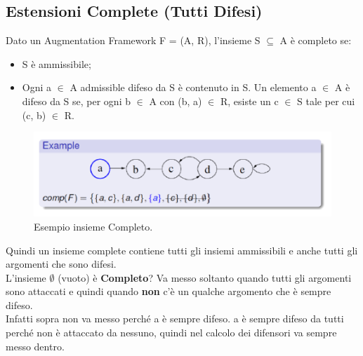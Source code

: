 \subsection{Estensioni Complete (Tutti Difesi)}
Dato un Augmentation Framework F = (A, R), l'insieme S $\subseteq$ A è completo
se:
\begin{itemize}
    \item S è ammissibile;
    \item Ogni a $\in$ A admissible difeso da S è contenuto in S. Un elemento a $\in$ A è
          difeso da S se, per ogni b $\in$ A con (b, a) $\in$ R, esiste un c $\in$ S
          tale per cui (c, b) $\in$ R.
\end{itemize}
\begin{figure}[htp]
    \centering
    \includegraphics[width=12cm, keepaspectratio]{capitoli/img/Cap6/completo.png}
    \caption{Esempio insieme Completo.}
\end{figure}
Quindi un insieme complete contiene tutti gli insiemi ammissibili e anche tutti
gli argomenti che sono difesi.\\
L'insieme $\emptyset$ (vuoto) è \textbf{Completo}? Va messo
soltanto quando tutti gli argomenti sono attaccati e quindi quando \textbf{non}
c'è un qualche argomento che è sempre difeso.\\
Infatti sopra non va messo
perché a è sempre difeso. a è sempre difeso da tutti perché non è attaccato da
nessuno, quindi nel calcolo dei difensori va sempre messo dentro.
